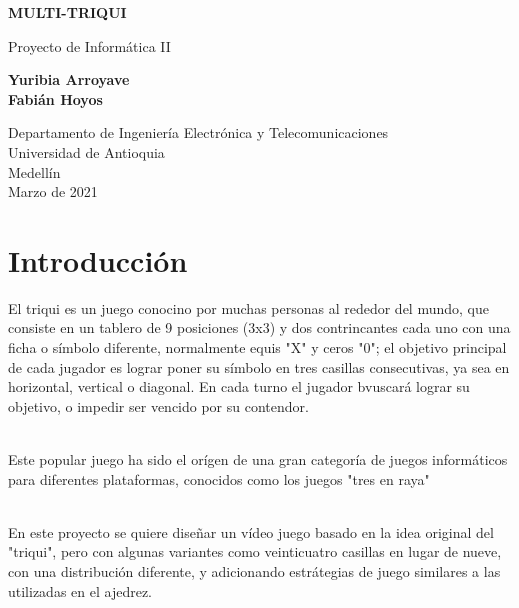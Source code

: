 \documentclass{article}
\begin{document}
\begin{titlepage}
    \begin{center}
        \vspace*{1cm}
            
        \Huge
        \textbf{MULTI-TRIQUI}
            
        \vspace{0.5cm}
        \LARGE
        Proyecto de Informática II
            
        \vspace{1.5cm}
            
        \textbf{Yuribia Arroyave\\
        Fabián Hoyos}
        
    
            
        \vfill
            
        \vspace{0.8cm}
            
        \Large
        Departamento de Ingeniería Electrónica y Telecomunicaciones\\
        Universidad de Antioquia\\
        Medellín\\
        Marzo de 2021
            
    \end{center}
\end{titlepage}

\tableofcontents
\newpage
\section{Introducción}\label{intro}
El triqui es un juego conocino por muchas personas al rededor del mundo, que consiste en un tablero de 9 posiciones (3x3) y dos contrincantes cada uno con una ficha o símbolo diferente, normalmente equis "X" y ceros "0"; el objetivo principal de cada jugador es lograr poner su símbolo en tres casillas consecutivas, ya sea en horizontal, vertical o diagonal. En cada turno el jugador bvuscará lograr su objetivo, o impedir ser vencido por su contendor.\\\

Este popular juego ha sido el orígen de una gran categoría de juegos informáticos para diferentes plataformas, conocidos como los juegos "tres en raya"\\\

En este proyecto se quiere diseñar un vídeo juego basado en la idea original del "triqui", pero con algunas variantes como veinticuatro casillas en lugar de nueve, con una distribución diferente, y adicionando estrátegias de juego similares a las utilizadas en el ajedrez.
\end{document}

